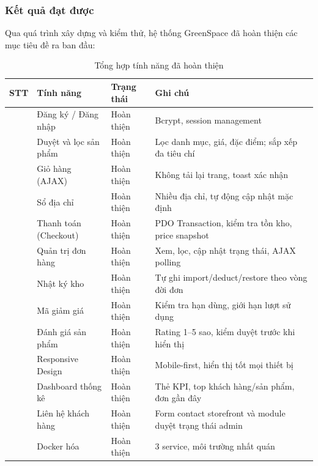 \documentclass[11pt, a4paper]{article}
\begin{document}
\subsubsection{Kết quả đạt được}

Qua quá trình xây dựng và kiểm thử, hệ thống GreenSpace đã hoàn thiện
các mục tiêu đề ra ban đầu:

\begin{table}[H]
    \centering
    \caption{Tổng hợp tính năng đã hoàn thiện}
    \label{tab:feature-summary}
    \begin{tabularx}{\linewidth}{|>{\centering\arraybackslash}p{1cm}
                                  |>{\raggedright\arraybackslash}p{4cm}
                                  |>{\centering\arraybackslash}p{2.5cm}
                                  |Y|}
        \hline
        \textbf{STT} & \textbf{Tính năng} & \textbf{Trạng thái} & \textbf{Ghi chú} \\   & Đăng ký / Đăng nhập    & Hoàn thiện & Bcrypt, session management \\   & Duyệt và lọc sản phẩm  & Hoàn thiện & Lọc danh mục, giá, đặc điểm; sắp xếp đa tiêu chí \\   & Giỏ hàng (AJAX)        & Hoàn thiện & Không tải lại trang, toast xác nhận \\   & Sổ địa chỉ             & Hoàn thiện & Nhiều địa chỉ, tự động cập nhật mặc định \\   & Thanh toán (Checkout)  & Hoàn thiện & PDO Transaction, kiểm tra tồn kho, price snapshot \\   & Quản trị đơn hàng      & Hoàn thiện & Xem, lọc, cập nhật trạng thái, AJAX polling \\   & Nhật ký kho            & Hoàn thiện & Tự ghi import/deduct/restore theo vòng đời đơn \\   & Mã giảm giá            & Hoàn thiện & Kiểm tra hạn dùng, giới hạn lượt sử dụng \\   & Đánh giá sản phẩm      & Hoàn thiện & Rating 1--5 sao, kiểm duyệt trước khi hiển thị \\  & Responsive Design      & Hoàn thiện & Mobile-first, hiển thị tốt mọi thiết bị \\  & Dashboard thống kê     & Hoàn thiện & Thẻ KPI, top khách hàng/sản phẩm, đơn gần đây \\  & Liên hệ khách hàng     & Hoàn thiện & Form contact storefront và module duyệt trạng thái admin \\  & Docker hóa             & Hoàn thiện & 3 service, môi trường nhất quán \\ \hline
    \end{tabularx}
\end{table}
\end{document}
